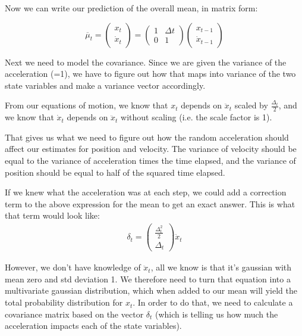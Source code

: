 \documentclass[10pt]{article}
\begin{document}
\begin{enumerate}
\begin{enumerate}
  Now we can write our prediction of the overall mean, in matrix form:

  $$
\overline{\mu}_t = \begin{pmatrix}x_t \\ \dot{x}_t\end{pmatrix} = 
\begin{pmatrix}1 & \Delta t \\ 0 & 1\end{pmatrix} \begin{pmatrix}x_{t-1} \\
\dot{x}_{t-1} \end{pmatrix}
  $$

  Next we need to model the covariance. Since we are given the variance of the
  acceleration (=1), we have to figure out how that maps into variance of the
  two state variables and make a variance vector accordingly.

  From our equations of motion, we know that $x_t$ depends on $\ddot{x}_t$
  scaled by $\frac{\Delta_t}{2}$, and we know that $\dot{x}_t$ depends on
  $\ddot{x}_t$ without scaling (i.e. the scale factor is 1).

  That gives us what we need to figure out how the random acceleration should
  affect our estimates for position and velocity. The variance of velocity
  should be equal to the variance of acceleration times the time elapsed, and
  the variance of position should be equal to half of the squared time elapsed. 

  If we knew what the acceleration was at each step, we could add a correction
  term to the above expression for the mean to get an exact answer. This is what
  that term would look like:
  \begin{gather}
  \delta_t = \begin{pmatrix}\frac{\Delta_t^2}{2} \\ \Delta_t\end{pmatrix} \ddot{x}_t
  \end{gather}
  
  However, we don't have knowledge of $\ddot{x}_t$, all we know is that it's
  gaussian with mean zero and std deviation 1. We therefore need to turn that
  equation into a multivariate gaussian distribution, which when added to our
  mean will yield the total probability distribution for $x_t$. In order to do
  that, we need to calculate a covariance matrix based on the vector $\delta_t$
  (which is telling us how much the acceleration impacts each of the state
  variables).


\end{enumerate}
\end{enumerate}
\end{document}
